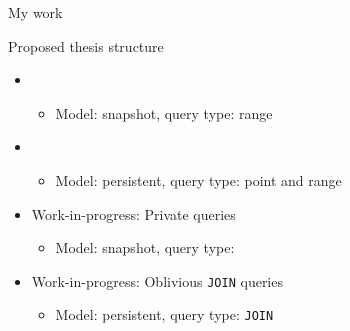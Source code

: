 	\begin{frame}{My work}

		\begin{block}{Proposed thesis structure}

			\begin{itemize}[label={}]
				\item<1> 

					\begin{itemize}[label={}]
						\item \small Model: \alert{snapshot}, query type: \alert{range} \normalsize
					\end{itemize}

				\item<2> 

					\begin{itemize}[label={}]
						\item \small Model: \alert{persistent}, query type: \alert{point} and \alert{range} \normalsize
					\end{itemize}

				\item<3> Work-in-progress: Private \knn{} queries

				\begin{itemize}[label={}]
					\item \small Model: \alert{snapshot}, query type: \alert{\knn{}} \normalsize
				\end{itemize}

				\item<4> Work-in-progress: Oblivious \texttt{JOIN} queries

				\begin{itemize}[label={}]
					\item \small Model: \alert{persistent}, query type: \alert{\texttt{JOIN}} \normalsize
				\end{itemize}

			\end{itemize}

		\end{block}

	\end{frame}
